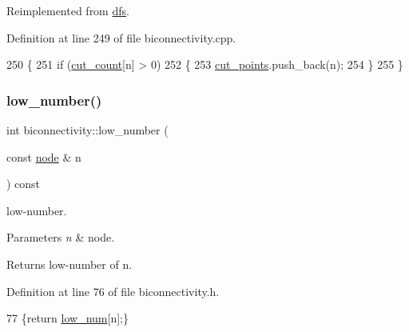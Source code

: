 Reimplemented from \mbox{\hyperlink{classdfs_abfe33292cd567f22596ba0c313481582}{dfs}}.



Definition at line 249 of file biconnectivity.\+cpp.


\begin{DoxyCode}
250 \{
251     \textcolor{keywordflow}{if} (\mbox{\hyperlink{classbiconnectivity_a67756de28954d13df615d8f2a93b22da}{cut\_count}}[n] > 0)
252     \{
253         \mbox{\hyperlink{classbiconnectivity_a776f4f2d5654ef6836aeb34690fdadc5}{cut\_points}}.push\_back(n);
254     \}
255 \}
\end{DoxyCode}
\mbox{\label{classbiconnectivity_ab61a092bfc7cf9e9b27210d339186327}} 
\subsubsection{\texorpdfstring{low\+\_\+number()}{low\_number()}}
{\footnotesize\ttfamily int biconnectivity\+::low\+\_\+number (\begin{DoxyParamCaption}\item[{const \mbox{\hyperlink{classnode}{node}} \&}]{n }\end{DoxyParamCaption}) const\hspace{0.3cm}{\ttfamily [inline]}}



low-\/number. 


\begin{DoxyParams}{Parameters}
{\em n} & node. \\
\hline
\end{DoxyParams}
\begin{DoxyReturn}{Returns}
low-\/number of n. 
\end{DoxyReturn}


Definition at line 76 of file biconnectivity.\+h.


\begin{DoxyCode}
77     \{\textcolor{keywordflow}{return} \mbox{\hyperlink{classbiconnectivity_ac5817e2122477ed591ef229c081745f3}{low\_num}}[n];\}
\end{DoxyCode}
\mbox{\label{classbiconnectivity_a774fd08203a6d164605afc4cdc8b9201}} 

